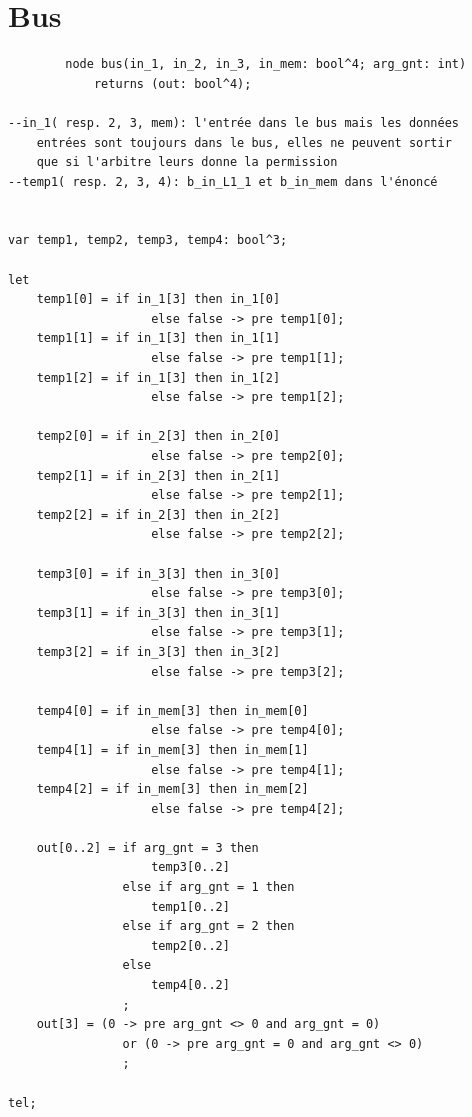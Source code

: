 \documentclass[a4paper,11pt]{report}
\begin{document}
\chapter{Bus}
	\begin{framed}
		\begin{verbatim}
		node bus(in_1, in_2, in_3, in_mem: bool^4; arg_gnt: int) 
			returns (out: bool^4);

--in_1( resp. 2, 3, mem): l'entrée dans le bus mais les données 
	entrées sont toujours dans le bus, elles ne peuvent sortir 
	que si l'arbitre leurs donne la permission
--temp1( resp. 2, 3, 4): b_in_L1_1 et b_in_mem dans l'énoncé


var temp1, temp2, temp3, temp4: bool^3;

let
    temp1[0] = if in_1[3] then in_1[0]
                    else false -> pre temp1[0];
    temp1[1] = if in_1[3] then in_1[1]
                    else false -> pre temp1[1];
    temp1[2] = if in_1[3] then in_1[2]
                    else false -> pre temp1[2];

    temp2[0] = if in_2[3] then in_2[0]
                    else false -> pre temp2[0];
    temp2[1] = if in_2[3] then in_2[1]
                    else false -> pre temp2[1];
    temp2[2] = if in_2[3] then in_2[2]
                    else false -> pre temp2[2];

    temp3[0] = if in_3[3] then in_3[0]
                    else false -> pre temp3[0];
    temp3[1] = if in_3[3] then in_3[1]
                    else false -> pre temp3[1];
    temp3[2] = if in_3[3] then in_3[2]
                    else false -> pre temp3[2];

    temp4[0] = if in_mem[3] then in_mem[0]
                    else false -> pre temp4[0];
    temp4[1] = if in_mem[3] then in_mem[1]
                    else false -> pre temp4[1];
    temp4[2] = if in_mem[3] then in_mem[2]
                    else false -> pre temp4[2];

    out[0..2] = if arg_gnt = 3 then
                    temp3[0..2]
                else if arg_gnt = 1 then
                    temp1[0..2]
                else if arg_gnt = 2 then
                    temp2[0..2]
                else
                    temp4[0..2]
                ;
    out[3] = (0 -> pre arg_gnt <> 0 and arg_gnt = 0)
                or (0 -> pre arg_gnt = 0 and arg_gnt <> 0)
                ;

tel;
		\end{verbatim}
	\end{framed}
	
\end{document}
